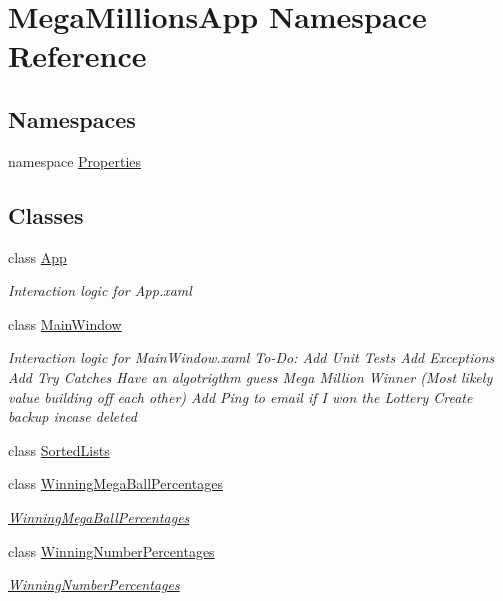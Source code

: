 \hypertarget{namespace_mega_millions_app}{}\section{Mega\+Millions\+App Namespace Reference}
\label{namespace_mega_millions_app}
\subsection*{Namespaces}
\begin{DoxyCompactItemize}
\item 
namespace \hyperlink{namespace_mega_millions_app_1_1_properties}{Properties}
\end{DoxyCompactItemize}
\subsection*{Classes}
\begin{DoxyCompactItemize}
\item 
class \hyperlink{class_mega_millions_app_1_1_app}{App}
\begin{DoxyCompactList}\small\item\em Interaction logic for App.\+xaml \end{DoxyCompactList}\item 
class \hyperlink{class_mega_millions_app_1_1_main_window}{Main\+Window}
\begin{DoxyCompactList}\small\item\em Interaction logic for Main\+Window.\+xaml To-\/\+Do\+: Add Unit Tests Add Exceptions Add Try Catches Have an algotrigthm guess Mega Million Winner (Most likely value building off each other) Add Ping to email if I won the Lottery Create backup incase deleted \end{DoxyCompactList}\item 
class \hyperlink{class_mega_millions_app_1_1_sorted_lists}{Sorted\+Lists}
\item 
class \hyperlink{class_mega_millions_app_1_1_winning_mega_ball_percentages}{Winning\+Mega\+Ball\+Percentages}
\begin{DoxyCompactList}\small\item\em \hyperlink{class_mega_millions_app_1_1_winning_mega_ball_percentages}{Winning\+Mega\+Ball\+Percentages} \end{DoxyCompactList}\item 
class \hyperlink{class_mega_millions_app_1_1_winning_number_percentages}{Winning\+Number\+Percentages}
\begin{DoxyCompactList}\small\item\em \hyperlink{class_mega_millions_app_1_1_winning_number_percentages}{Winning\+Number\+Percentages} \end{DoxyCompactList}\end{DoxyCompactItemize}
